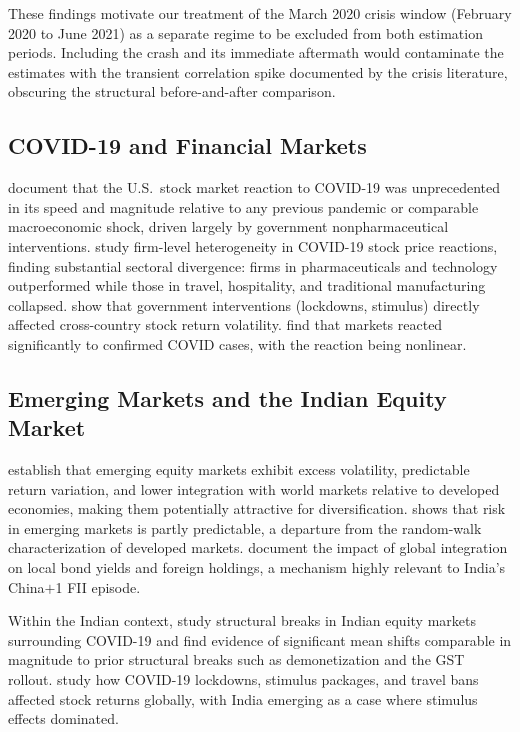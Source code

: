 \documentclass[12pt,a4paper]{article}
\begin{document}
These findings motivate our treatment of the March 2020 crisis window (February 2020 to
June 2021) as a separate regime to be excluded from both estimation periods. Including
the crash and its immediate aftermath would contaminate the estimates with the transient
correlation spike documented by the crisis literature, obscuring the structural
before-and-after comparison.

\subsection{COVID-19 and Financial Markets}

\citet{Baker2020} document that the U.S.\ stock market reaction to COVID-19 was
unprecedented in its speed and magnitude relative to any previous pandemic or comparable
macroeconomic shock, driven largely by government nonpharmaceutical interventions.
\citet{RamelliWagner2020} study firm-level heterogeneity in COVID-19 stock price
reactions, finding substantial sectoral divergence: firms in pharmaceuticals and
technology outperformed while those in travel, hospitality, and traditional manufacturing
collapsed. \citet{Zaremba2020} show that government interventions (lockdowns, stimulus)
directly affected cross-country stock return volatility. \citet{Ashraf2020} find that
markets reacted significantly to confirmed COVID cases, with the reaction being
nonlinear.

\subsection{Emerging Markets and the Indian Equity Market}

\citet{BekaertHarvey1997} establish that emerging equity markets exhibit excess
volatility, predictable return variation, and lower integration with world markets
relative to developed economies, making them potentially attractive for diversification.
\citet{Harvey1995} shows that risk in emerging markets is partly predictable, a
departure from the random-walk characterization of developed markets.
\citet{BekaertHoerova2014} document the impact of global integration on local bond
yields and foreign holdings, a mechanism highly relevant to India's China$+$1 FII
episode.

Within the Indian context, \citet{Mishra2020} study structural breaks in Indian equity
markets surrounding COVID-19 and find evidence of significant mean shifts comparable
in magnitude to prior structural breaks such as demonetization and the GST rollout.
\citet{Narayan2021} study how COVID-19 lockdowns, stimulus packages, and travel bans
affected stock returns globally, with India emerging as a case where stimulus effects
dominated.
\end{document}
